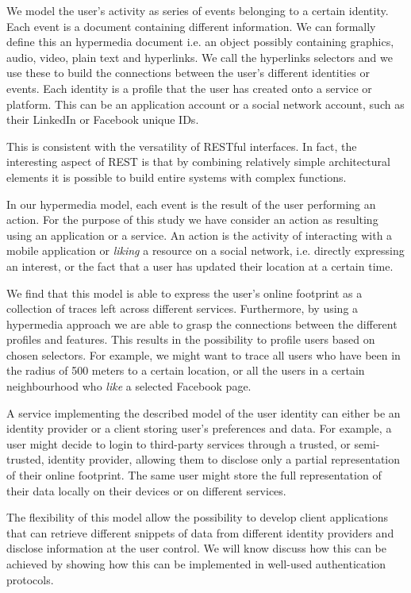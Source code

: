 We model the user's activity as series of events belonging to a certain identity. Each event is a document containing different information. We can formally define this an hypermedia document i.e. an object possibly containing graphics, audio, video, plain text and hyperlinks. We call the hyperlinks selectors and we use these to build the connections between the user's different identities or events. Each identity is a profile that the user has created onto a service or platform. This can be an application account or a social network account, such as their LinkedIn or Facebook unique IDs.

This is consistent with the versatility of RESTful interfaces. In fact, the interesting aspect of REST is that by combining relatively simple architectural elements it is possible to build entire systems with complex functions.

In our hypermedia model, each event is the result of the user performing an action. For the purpose of this study we have consider an action as resulting using an application or a service. An action is the activity of interacting with a mobile application or \emph{liking} a resource on a social network, i.e. directly expressing an interest, or the fact that a user has updated their location at a certain time.

We find that this model is able to express the user's online footprint as a collection of traces left across different services. Furthermore, by using a hypermedia approach we are able to grasp the connections between the different profiles and features. This results in the possibility to profile users based on chosen selectors. For example, we might want to trace all users who have been in the radius of 500 meters to a certain location, or all the users in a certain neighbourhood who \emph{like} a selected Facebook page.

A service implementing the described model of the user identity can either be an identity provider or a client storing user's preferences and data. For example, a user might decide to login to third-party services through a trusted, or semi-trusted, identity provider, allowing them to disclose only a partial representation of their online footprint. The same user might store the full representation of their data locally on their devices or on different services.

The flexibility of this model allow the possibility to develop client applications that can retrieve different snippets of data from different identity providers and disclose information at the user control. We will know discuss how this can be achieved by showing how this can be implemented in well-used authentication protocols.

